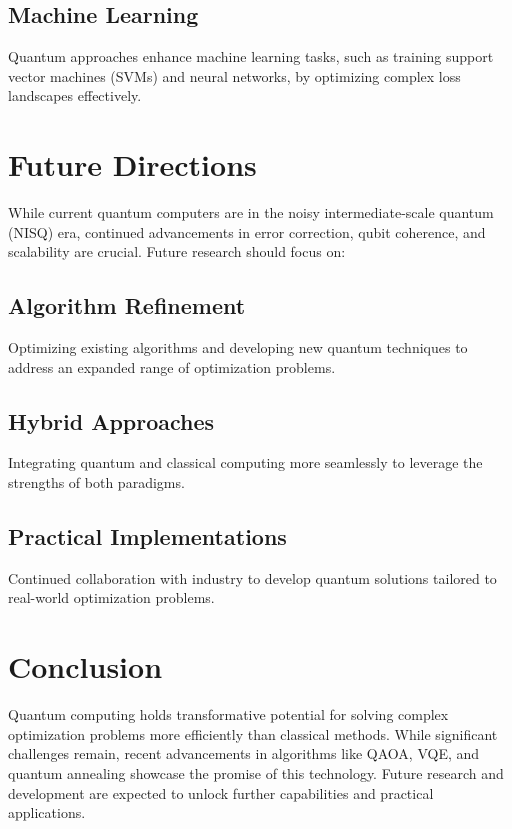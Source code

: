 \documentclass{article}
\begin{document}
\subsection{Machine Learning}
Quantum approaches enhance machine learning tasks, such as training support vector machines (SVMs) and neural networks, by optimizing complex loss landscapes effectively.

\section{Future Directions}
While current quantum computers are in the noisy intermediate-scale quantum (NISQ) era, continued advancements in error correction, qubit coherence, and scalability are crucial. Future research should focus on:

\subsection{Algorithm Refinement}
Optimizing existing algorithms and developing new quantum techniques to address an expanded range of optimization problems.

\subsection{Hybrid Approaches}
Integrating quantum and classical computing more seamlessly to leverage the strengths of both paradigms.

\subsection{Practical Implementations}
Continued collaboration with industry to develop quantum solutions tailored to real-world optimization problems.

\section{Conclusion}
Quantum computing holds transformative potential for solving complex optimization problems more efficiently than classical methods. While significant challenges remain, recent advancements in algorithms like QAOA, VQE, and quantum annealing showcase the promise of this technology. Future research and development are expected to unlock further capabilities and practical applications.



\end{document}
